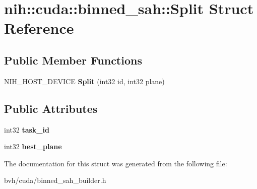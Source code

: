 \hypertarget{structnih_1_1cuda_1_1binned__sah_1_1_split}{
\section{nih\-:\-:cuda\-:\-:binned\-\_\-sah\-:\-:\-Split \-Struct \-Reference}
\label{structnih_1_1cuda_1_1binned__sah_1_1_split}
}
\subsection*{\-Public \-Member \-Functions}
\begin{DoxyCompactItemize}
\item 
\hypertarget{structnih_1_1cuda_1_1binned__sah_1_1_split_a74ab233f7e51e2721e74b4cf3eff0d60}{
\-N\-I\-H\-\_\-\-H\-O\-S\-T\-\_\-\-D\-E\-V\-I\-C\-E {\bfseries \-Split} (int32 id, int32 plane)}
\label{structnih_1_1cuda_1_1binned__sah_1_1_split_a74ab233f7e51e2721e74b4cf3eff0d60}

\end{DoxyCompactItemize}
\subsection*{\-Public \-Attributes}
\begin{DoxyCompactItemize}
\item 
\hypertarget{structnih_1_1cuda_1_1binned__sah_1_1_split_a77ebba0b7f5f76acd3301643412ab8dc}{
int32 {\bfseries task\-\_\-id}}
\label{structnih_1_1cuda_1_1binned__sah_1_1_split_a77ebba0b7f5f76acd3301643412ab8dc}

\item 
\hypertarget{structnih_1_1cuda_1_1binned__sah_1_1_split_a589333c7bbb9adfefa3cc628f27da589}{
int32 {\bfseries best\-\_\-plane}}
\label{structnih_1_1cuda_1_1binned__sah_1_1_split_a589333c7bbb9adfefa3cc628f27da589}

\end{DoxyCompactItemize}


\-The documentation for this struct was generated from the following file\-:\begin{DoxyCompactItemize}
\item 
bvh/cuda/binned\-\_\-sah\-\_\-builder.\-h\end{DoxyCompactItemize}
